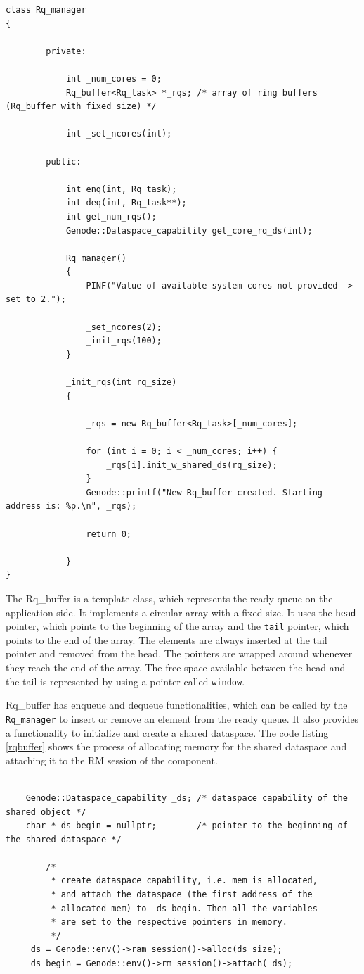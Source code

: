 \begin{lstlisting}[caption={Rq\_manager class},label={rqmanager}, style=customcpp]
class Rq_manager
{	

		private:

			int _num_cores = 0;
			Rq_buffer<Rq_task> *_rqs; /* array of ring buffers (Rq_buffer with fixed size) */
			
			int _set_ncores(int);

		public:

			int enq(int, Rq_task);
			int deq(int, Rq_task**);
			int get_num_rqs();
			Genode::Dataspace_capability get_core_rq_ds(int);

			Rq_manager()
			{
				PINF("Value of available system cores not provided -> set to 2.");

				_set_ncores(2);
				_init_rqs(100);
			}

			_init_rqs(int rq_size)
			{

				_rqs = new Rq_buffer<Rq_task>[_num_cores];

				for (int i = 0; i < _num_cores; i++) {
					_rqs[i].init_w_shared_ds(rq_size);
				}
				Genode::printf("New Rq_buffer created. Starting address is: %p.\n", _rqs);

				return 0;

			}
}
\end{lstlisting}

The Rq\_buffer is a template class, which represents the ready queue on the application side. It implements a circular array with a fixed size. It uses the \texttt{head} pointer, which points to the beginning of the array and the \texttt{tail} pointer, which points to the end of the array. The elements are always inserted at the tail pointer and removed from the head. The pointers are wrapped around whenever they reach the end of the array. The free space available between the head and the tail is represented by using a pointer called \texttt{window}. 

Rq\_buffer has enqueue and dequeue functionalities, which can be called by the \texttt{Rq\_manager} to insert or remove an element from the ready queue. It also provides a functionality to initialize and create a shared dataspace. The code listing \ref{rqbuffer} shows the process of allocating memory for the shared dataspace and attaching it to the RM session of the component.

\begin{lstlisting}[caption={Allocating dataspace},label={rqbuffer}, style=customcpp]

	Genode::Dataspace_capability _ds; /* dataspace capability of the shared object */
	char *_ds_begin = nullptr;        /* pointer to the beginning of the shared dataspace */

		/* 
		 * create dataspace capability, i.e. mem is allocated,
		 * and attach the dataspace (the first address of the
		 * allocated mem) to _ds_begin. Then all the variables
		 * are set to the respective pointers in memory.
		 */
	_ds = Genode::env()->ram_session()->alloc(ds_size);
	_ds_begin = Genode::env()->rm_session()->attach(_ds);

\end{lstlisting}

